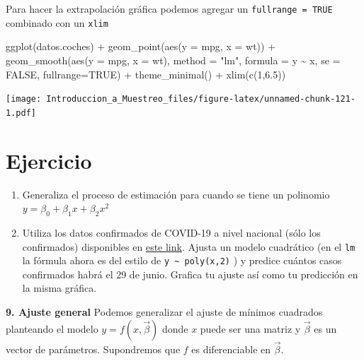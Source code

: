 \documentclass[
]{book}
\newenvironment{Shaded}{\begin{snugshade}}{\end{snugshade}}
\newcommand{\AttributeTok}[1]{\textcolor[rgb]{0.77,0.63,0.00}{#1}}
\newcommand{\ConstantTok}[1]{\textcolor[rgb]{0.00,0.00,0.00}{#1}}
\newcommand{\DecValTok}[1]{\textcolor[rgb]{0.00,0.00,0.81}{#1}}
\newcommand{\FloatTok}[1]{\textcolor[rgb]{0.00,0.00,0.81}{#1}}
\newcommand{\FunctionTok}[1]{\textcolor[rgb]{0.00,0.00,0.00}{#1}}
\newcommand{\NormalTok}[1]{#1}
\newcommand{\SpecialCharTok}[1]{\textcolor[rgb]{0.00,0.00,0.00}{#1}}
\newcommand{\StringTok}[1]{\textcolor[rgb]{0.31,0.60,0.02}{#1}}
\providecommand{\tightlist}{%
  \setlength{\itemsep}{0pt}\setlength{\parskip}{0pt}}
\begin{document}
Para hacer la extrapolación gráfica podemos agregar un \texttt{fullrange\ =\ TRUE} combinado con un \texttt{xlim}

\begin{Shaded}
\begin{Highlighting}[]
\FunctionTok{ggplot}\NormalTok{(datos.coches) }\SpecialCharTok{+}
  \FunctionTok{geom\_point}\NormalTok{(}\FunctionTok{aes}\NormalTok{(}\AttributeTok{y =}\NormalTok{ mpg, }\AttributeTok{x =}\NormalTok{ wt)) }\SpecialCharTok{+}
  \FunctionTok{geom\_smooth}\NormalTok{(}\FunctionTok{aes}\NormalTok{(}\AttributeTok{y =}\NormalTok{ mpg, }\AttributeTok{x =}\NormalTok{ wt), }\AttributeTok{method =} \StringTok{"lm"}\NormalTok{, }
              \AttributeTok{formula =}\NormalTok{ y }\SpecialCharTok{\textasciitilde{}}\NormalTok{ x, }\AttributeTok{se =} \ConstantTok{FALSE}\NormalTok{, }\AttributeTok{fullrange=}\ConstantTok{TRUE}\NormalTok{) }\SpecialCharTok{+}
  \FunctionTok{theme\_minimal}\NormalTok{() }\SpecialCharTok{+}
  \FunctionTok{xlim}\NormalTok{(}\FunctionTok{c}\NormalTok{(}\DecValTok{1}\NormalTok{,}\FloatTok{6.5}\NormalTok{))}
\end{Highlighting}
\end{Shaded}

\texttt{[image: Introduccion\_a\_Muestreo\_files/figure-latex/unnamed-chunk-121-1.pdf]}

\hypertarget{ejercicio-3}{%
\section{Ejercicio}\label{ejercicio-3}}

\begin{enumerate}
\def\labelenumi{\arabic{enumi}.}
\tightlist
\item
  Generaliza el proceso de estimación para cuando se tiene un polinomio \(y = \beta_0 + \beta_1 x + \beta_2 x^2\)
\item
  Utiliza los datos confirmados de COVID-19 a nivel nacional (sólo los confirmados) disponibles en \href{https://datos.gob.mx/busca/dataset/informacion-referente-a-casos-covid-19-en-mexico}{este link}. Ajusta un modelo cuadrático (en el \texttt{lm} la fórmula ahora es del estilo de \texttt{y\ \textasciitilde{}\ poly(x,2)} ) y predice cuántos casos confirmados habrá el 29 de junio. Grafica tu ajuste así como tu predicción en la misma gráfica.
\end{enumerate}

\textbf{9. Ajuste general}
Podemos generalizar el ajuste de mínimos cuadrados planteando el modelo \(y = f(x, \vec{\beta})\) donde \(x\) puede ser una matriz y \(\vec{\beta}\) es un vector de parámetros. Supondremos que \(f\) es diferenciable en \(\vec{\beta}\).
\end{document}
